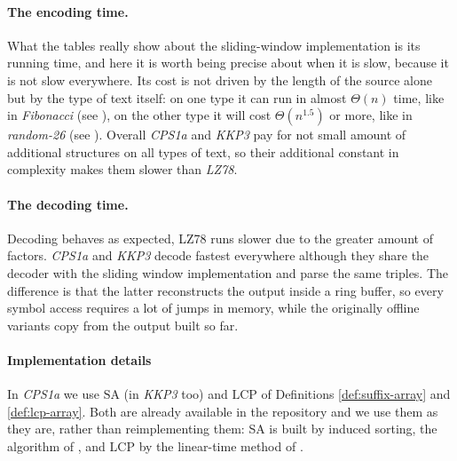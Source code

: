 \paragraph{The encoding time.}
What the tables really show about the sliding-window implementation is its running time, and here it is worth being precise about when it is slow, because it is not slow everywhere. Its cost is not driven by the length of the source alone but by the type of text itself: on one type it can run in almost \(\Theta(n)\) time, like in \emph{Fibonacci} (see ), on the other type it will cost \(\Theta(n^{1.5})\) or more, like in \emph{random-26} (see ). Overall \emph{CPS1a} and \emph{KKP3} pay for not small amount of additional structures on all types of text, so their additional constant in complexity makes them slower than \emph{LZ78}.

\paragraph{The decoding time.}
Decoding behaves as expected, LZ78 runs slower due to the greater amount of factors. \emph{CPS1a} and \emph{KKP3} decode fastest everywhere although they share the decoder with the sliding window implementation and parse the same triples. The difference is that the latter reconstructs the output inside a ring buffer, so every symbol access requires a lot of jumps in memory, while the originally offline variants copy from the output built so far.


\paragraph{Implementation details}
In \emph{CPS1a} we use \(\mathrm{SA}\) (in \emph{KKP3} too) and \(\mathrm{LCP}\) of Definitions \ref{def:suffix-array} and \ref{def:lcp-array}. Both are already available in the repository and we use them as they are, rather than reimplementing them: SA is built by induced sorting, the algorithm of \cite{nong2009}, and \(\mathrm{LCP}\) by the linear-time method of \cite{kasai2001}.